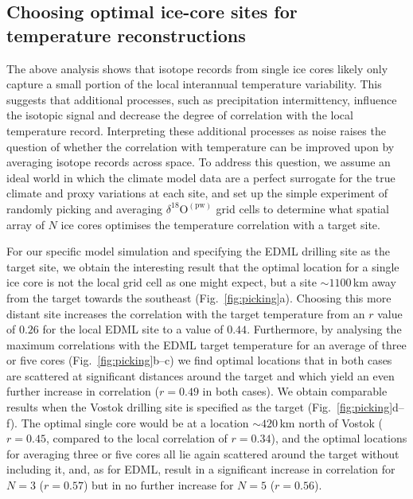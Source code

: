 \documentclass[cp, manuscript]{copernicus}
\begin{document}
\subsection{Choosing optimal ice-core sites for temperature reconstructions}
\label{results:picking}

The above analysis shows that isotope records from single ice cores likely only
capture a small portion of the local interannual temperature variability. This
suggests that additional processes, such as precipitation intermittency,
influence the isotopic signal and decrease the degree of correlation with the
local temperature record. Interpreting these additional processes as noise
raises the question of whether the correlation with temperature can be improved
upon by averaging isotope records across space. To address this question, we
assume an ideal world in which the climate model data are a perfect
surrogate for the true climate and proxy variations at each site, and set up
the simple experiment of randomly picking and averaging
$\delta^{18}\mathrm{O}^{\mathrm{(pw)}}$ grid cells to determine what spatial
array of $N$ ice cores optimises the temperature correlation with a target
site.

For our specific model simulation and specifying the EDML drilling site as the
target site, we obtain the interesting result that the optimal location for a
single ice core is not the local grid cell as one might expect, but a site
$\sim1100$\,km away from the target towards the southeast
(Fig.~\ref{fig:picking}a). Choosing this more distant site increases the
correlation with the target temperature from an $r$ value of $0.26$ for the
local EDML site to a value of $0.44$. Furthermore, by analysing the maximum
correlations with the EDML target temperature for an average of three or five
cores (Fig.~\ref{fig:picking}b--c) we find optimal locations that in both cases
are scattered at significant distances around the target and which yield an even
further increase in correlation ($r=0.49$ in both cases). We obtain comparable
results when the Vostok drilling site is specified as the target
(Fig.~\ref{fig:picking}d--f). The optimal single core would be at a location
$\sim420$\,km north of Vostok ($r=0.45$, compared to the local correlation of
$r=0.34$), and the optimal locations for averaging three or five cores all lie
again scattered around the target without including it, and, as for EDML, result
in a significant increase in correlation for $N=3$ ($r=0.57$) but in no further
increase for $N=5$ ($r=0.56$).
\end{document}
